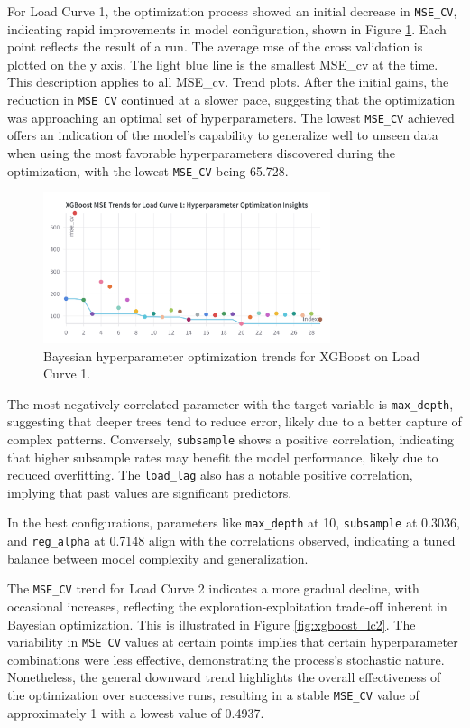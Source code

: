 \documentclass{article} %
\begin{document}
For Load Curve 1, the optimization process showed an initial decrease in \texttt{MSE\_CV}, indicating rapid improvements in model configuration, shown in Figure \ref{fig:xgboost_lc1}. Each point reflects the result of a run. The average mse of the cross validation is plotted on the y axis. The light blue line is the smallest MSE\_cv at the time. This description applies to all MSE\_cv. Trend plots. After the initial gains, the reduction in \texttt{MSE\_CV} continued at a slower pace, suggesting that the optimization was approaching an optimal set of hyperparameters. The lowest \texttt{MSE\_CV} achieved offers an indication of the model's capability to generalize well to unseen data when using the most favorable hyperparameters discovered during the optimization, with the lowest \texttt{MSE\_CV} being 65.728.
\begin{figure}[H]
    \centering
    \includegraphics[width=0.75\textwidth]{ressources/Hyperparams/XGBoost/XGBoost MSE Trends for Load Curve 1 Hyperparameter Optimization Insights(1).png}
    \caption{Bayesian hyperparameter optimization trends for XGBoost on Load Curve 1.}
    \label{fig:xgboost_lc1}
\end{figure}
The most negatively correlated parameter with the target variable is \texttt{max\_depth}, suggesting that deeper trees tend to reduce error, likely due to a better capture of complex patterns. Conversely, \texttt{subsample} shows a positive correlation, indicating that higher subsample rates may benefit the model performance, likely due to reduced overfitting. The \texttt{load\_lag} also has a notable positive correlation, implying that past values are significant predictors.

In the best configurations, parameters like \texttt{max\_depth} at 10, \texttt{subsample} at 0.3036, and \texttt{reg\_alpha} at 0.7148 align with the correlations observed, indicating a tuned balance between model complexity and generalization.


The \texttt{MSE\_CV} trend for Load Curve 2 indicates a more gradual decline, with occasional increases, reflecting the exploration-exploitation trade-off inherent in Bayesian optimization. This is illustrated in Figure \ref{fig:xgboost_lc2}. The variability in \texttt{MSE\_CV} values at certain points implies that certain hyperparameter combinations were less effective, demonstrating the process's stochastic nature. Nonetheless, the general downward trend highlights the overall effectiveness of the optimization over successive runs, resulting in a stable \texttt{MSE\_CV} value of approximately 1 with a lowest value of 0.4937.
\end{document}
